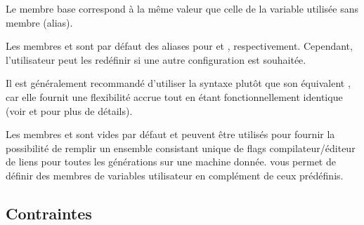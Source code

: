 Le membre base correspond à la même valeur que celle de la variable utilisée sans membre (alias).

Les membres  et  sont par défaut des aliases pour  et , respectivement. Cependant, l'utilisateur peut les redéfinir si une autre configuration est souhaitée.

Il est généralement recommandé d'utiliser la syntaxe  plutôt que son équivalent , car elle fournit une flexibilité accrue tout en étant fonctionnellement identique (voir  et  pour plus de détails).

Les membres  et  sont vides par défaut et peuvent être utilisés pour fournir la possibilité de remplir un ensemble consistant unique de flags compilateur/éditeur de liens pour toutes les générations sur une machine donnée. \codeblocks vous permet de définir des membres de variables utilisateur en complément de ceux prédéfinis.

\subsection{Contraintes}

